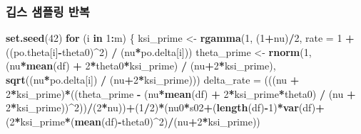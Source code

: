 \documentclass[
]{article}
\newenvironment{Shaded}{\begin{snugshade}}{\end{snugshade}}
\newcommand{\AttributeTok}[1]{\textcolor[rgb]{0.13,0.29,0.53}{#1}}
\newcommand{\ControlFlowTok}[1]{\textcolor[rgb]{0.13,0.29,0.53}{\textbf{#1}}}
\newcommand{\DecValTok}[1]{\textcolor[rgb]{0.00,0.00,0.81}{#1}}
\newcommand{\FunctionTok}[1]{\textcolor[rgb]{0.13,0.29,0.53}{\textbf{#1}}}
\newcommand{\NormalTok}[1]{#1}
\newcommand{\OtherTok}[1]{\textcolor[rgb]{0.56,0.35,0.01}{#1}}
\newcommand{\SpecialCharTok}[1]{\textcolor[rgb]{0.81,0.36,0.00}{\textbf{#1}}}
\begin{document}
\subsubsection{깁스 샘플링
반복}\label{uxae41uxc2a4-uxc0d8uxd50cuxb9c1-uxbc18uxbcf5}

\begin{Shaded}
\begin{Highlighting}[]
\FunctionTok{set.seed}\NormalTok{(}\DecValTok{42}\NormalTok{)}
\ControlFlowTok{for}\NormalTok{ (i }\ControlFlowTok{in} \DecValTok{1}\SpecialCharTok{:}\NormalTok{m) \{}
\NormalTok{  ksi\_prime }\OtherTok{\textless{}{-}} \FunctionTok{rgamma}\NormalTok{(}\DecValTok{1}\NormalTok{, (}\DecValTok{1}\SpecialCharTok{+}\NormalTok{nu)}\SpecialCharTok{/}\DecValTok{2}\NormalTok{, }\AttributeTok{rate =} \DecValTok{1} \SpecialCharTok{+}\NormalTok{ ((po.theta[i]}\SpecialCharTok{{-}}\NormalTok{theta0)}\SpecialCharTok{\^{}}\DecValTok{2}\NormalTok{) }\SpecialCharTok{/}\NormalTok{ (nu}\SpecialCharTok{*}\NormalTok{po.delta[i]))}
\NormalTok{  theta\_prime }\OtherTok{\textless{}{-}} \FunctionTok{rnorm}\NormalTok{(}\DecValTok{1}\NormalTok{, (nu}\SpecialCharTok{*}\FunctionTok{mean}\NormalTok{(df) }\SpecialCharTok{+} \DecValTok{2}\SpecialCharTok{*}\NormalTok{theta0}\SpecialCharTok{*}\NormalTok{ksi\_prime) }\SpecialCharTok{/}\NormalTok{ (nu}\SpecialCharTok{+}\DecValTok{2}\SpecialCharTok{*}\NormalTok{ksi\_prime), }\FunctionTok{sqrt}\NormalTok{((nu}\SpecialCharTok{*}\NormalTok{po.delta[i]) }\SpecialCharTok{/}\NormalTok{ (nu}\SpecialCharTok{+}\DecValTok{2}\SpecialCharTok{*}\NormalTok{ksi\_prime)))}
\NormalTok{  delta\_rate }\OtherTok{=}\NormalTok{ (((nu }\SpecialCharTok{+} \DecValTok{2}\SpecialCharTok{*}\NormalTok{ksi\_prime)}\SpecialCharTok{*}\NormalTok{((theta\_prime }\SpecialCharTok{{-}}\NormalTok{ (nu}\SpecialCharTok{*}\FunctionTok{mean}\NormalTok{(df) }\SpecialCharTok{+} \DecValTok{2}\SpecialCharTok{*}\NormalTok{ksi\_prime}\SpecialCharTok{*}\NormalTok{theta0) }\SpecialCharTok{/}\NormalTok{ (nu }\SpecialCharTok{+} \DecValTok{2}\SpecialCharTok{*}\NormalTok{ksi\_prime))}\SpecialCharTok{\^{}}\DecValTok{2}\NormalTok{))}\SpecialCharTok{/}\NormalTok{(}\DecValTok{2}\SpecialCharTok{*}\NormalTok{nu))}\SpecialCharTok{+}\NormalTok{(}\DecValTok{1}\SpecialCharTok{/}\DecValTok{2}\NormalTok{)}\SpecialCharTok{*}\NormalTok{(nu0}\SpecialCharTok{*}\NormalTok{s02}\SpecialCharTok{+}\NormalTok{(}\FunctionTok{length}\NormalTok{(df)}\SpecialCharTok{{-}}\DecValTok{1}\NormalTok{)}\SpecialCharTok{*}\FunctionTok{var}\NormalTok{(df)}\SpecialCharTok{+}\NormalTok{(}\DecValTok{2}\SpecialCharTok{*}\NormalTok{ksi\_prime}\SpecialCharTok{*}\NormalTok{(}\FunctionTok{mean}\NormalTok{(df)}\SpecialCharTok{{-}}\NormalTok{theta0)}\SpecialCharTok{\^{}}\DecValTok{2}\NormalTok{)}\SpecialCharTok{/}\NormalTok{(nu}\SpecialCharTok{+}\DecValTok{2}\SpecialCharTok{*}\NormalTok{ksi\_prime))}

\end{Highlighting}
\end{Shaded}
\end{document}
